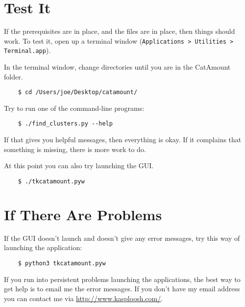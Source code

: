\section{Test It}

If the prerequisites are in place, and the files are in place, then things
should work. To test it, open up a terminal window
(\texttt{Applications > Utilities > Terminal.app}).

In the terminal window, change directories until you are in the CatAmount
folder.

\begin{verbatim}
    $ cd /Users/joe/Desktop/catamount/
\end{verbatim}

Try to run one of the command-line programs:

\begin{verbatim}
    $ ./find_clusters.py --help
\end{verbatim}

If that gives you helpful messages, then everything is okay. If it complains
that something is missing, there is more work to do.

At this point you can also try launching the GUI.

\begin{verbatim}
    $ ./tkcatamount.pyw
\end{verbatim}

\section{If There Are Problems}

If the GUI doesn't launch and doesn't give any error messages, try this
way of launching the application:

\begin{verbatim}
    $ python3 tkcatamount.pyw
\end{verbatim}

If you run into persistent problems launching the applications, the best way
to get help is to email me the error messages. If you don't have my email address
you can contact me via \url{http://www.kasploosh.com/}.
